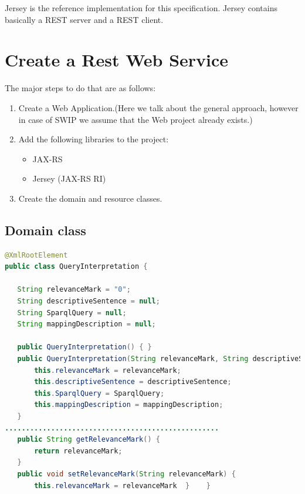 \par Jersey is the reference implementation for this specification. Jersey contains basically a REST server and a REST client.
\\
\section{Create a Rest Web Service}
\par The major steps to do that are as follows: \\
\begin{enumerate}
	\item Create a Web Application.(Here we talk about the general approach, however in case of SWIP we assume that the Web project already exists.)
	\item Add the following libraries to the project:
\begin{itemize}
	\item JAX-RS
	\item Jersey (JAX-RS RI) 
\end{itemize}
	\item Create the domain and resource classes. 
\end{enumerate}
   
\subsection{Domain class}

\begin{lstlisting}[language=Java]
@XmlRootElement
public class QueryInterpretation {

   String relevanceMark = "0";
   String descriptiveSentence = null;
   String SparqlQuery = null;
   String mappingDescription = null;

   public QueryInterpretation() { }
   public QueryInterpretation(String relevanceMark, String descriptiveSentence, String SparqlQuery, String mappingDescription) {
       this.relevanceMark = relevanceMark;
       this.descriptiveSentence = descriptiveSentence;
       this.SparqlQuery = SparqlQuery;
       this.mappingDescription = mappingDescription;
   }
...................................................
   public String getRelevanceMark() {
       return relevanceMark;
   }
   public void setRelevanceMark(String relevanceMark) {
       this.relevanceMark = relevanceMark  }    }
	
\end{lstlisting}

